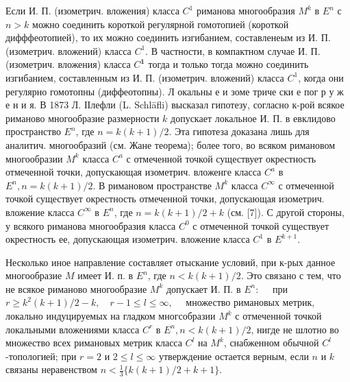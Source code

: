 \documentclass[10pt]{article}
\begin{document}
Если И. П. (изометрич. вложения) класса $C^{1}$ риманова многообразия $M^{k}$ в $E^{n}$ с $n>k$ можно соединить короткой регулярной гомотопией (короткой дифффеотопией), то их можно соединить изгибанием, составленеым из И. П. (изометрич. вложений) класса $C^{1}$. В частности, в компактном случае И. П. (изометрич. вложения) класса $C^{\mathbf{1}}$ тогда и только тогда можно соединить изгибанием, составленным из И. П. (изометрич. вложений) класса $C^{1}$, когда они регулярно гомотопны (диффеотопны). Л окальны е и зоме триче ски е пог р у ж е н и я. В 1873 Л. ІІлефли (L. Schläfli) высказал гипотезу, согласно к-рой всякое риманово многообразие размерности $k$ допускает локальное И. П. в евклидово пространство $E^{n}$, где $n=k(k+1) / 2$. Эта гипотеза доказана лишь для аналитич. многообразий (см. Жане теорема); более того, во всяком римановом многообразии $M^{k}$ класса $C^{a}$ с отмеченной точкой существует окрестность отмеченной точки, допускающая изометрич. вложенге класса $C^{a}$ в $E^{n}, n=k(k+1) / 2$. В римановом пространстве $M^{k}$ класса $C^{\infty}$ с отмеченной точкой существует окрестность отмеченной точки, допускающая изометрич. вложение класса $C^{\infty}$ в $E^{n}$, где $n=k(k+1) / 2+k$ (см. [7]). С другой стороны, у всякого риманова многообразия класса $C^{0}$ с отмеченной точкой существует окрестность ее, допускающая изометрич. вложение класса $C^{1}$ в $E^{k+1}$.



Несколько иное направление составляет отыскание условий, при к-рых данное многообразие $M$ имеет И. п. в $E^{n}$, где $n<k(k+1) / 2$. Это связано с тем, что не всякое риманово многообразие $M^{k}$ допускает И. П. в $E^{n}: \quad$ при $r \geqslant k^{2}(k+1) / 2-k, \quad r-1 \leqslant l \leqslant \infty, \quad$ множество римановых метрик, локально индуцируемых на гладком многсобразии $M^{k}$ с отмеченной точкой локальными вложениями класса $C^{r}$ в $E^{n}, n<k(k+1) / 2$, нигде не шлотно во множество всех римановых метрик класса $C^{l}$ на $M^{k}$, снабженном обычной $C^{l}$-топологией; при $r=2$ и $2 \leqslant l \leqslant \infty$ утверждение остается верным, если $n$ и $k$ связаны неравенством $n<\frac{1}{3}\{k(k+1) / 2+k+1\}$.
\end{document}
